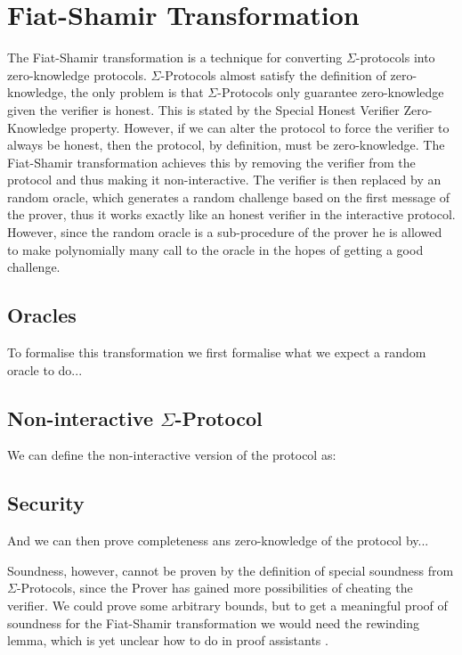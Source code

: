 \section{Fiat-Shamir Transformation}
\label{subsec:fiat-shamir}
The Fiat-Shamir transformation is a technique for converting $\Sigma$-protocols
into zero-knowledge protocols. $\Sigma$-Protocols almost satisfy the definition
of zero-knowledge, the only problem is that $\Sigma$-Protocols only guarantee
zero-knowledge given the verifier is honest. This is stated by the Special
Honest Verifier Zero-Knowledge property. However, if we can alter the protocol
to force the verifier to always be honest, then the protocol, by definition,
must be zero-knowledge.
The Fiat-Shamir transformation achieves this by removing the verifier from the
protocol and thus making it non-interactive. The verifier is then replaced by an
random oracle, which generates a random challenge based on the first message of
the prover, thus it works exactly like an honest verifier in the interactive
protocol. However, since the random oracle is a sub-procedure of the prover he
is allowed to make polynomially many call to the oracle in the hopes of getting
a good challenge.

\subsection{Oracles}
\label{subsec:sigma:fiat:oracle}


To formalise this transformation we first formalise what we expect a random
oracle to do...

\subsection{Non-interactive $\Sigma$-Protocol}
\label{subsec:sigma:fiat:protocol}

We can define the non-interactive version of the protocol as:

\subsection{Security}
\label{subsec:sigma:fiat:security}

And we can then prove completeness ans zero-knowledge of the protocol by...

Soundness, however, cannot be proven by the definition of special soundness from
$\Sigma$-Protocols, since the Prover has gained more possibilities of cheating
the verifier. We could prove some arbitrary bounds, but to get a meaningful
proof of soundness for the Fiat-Shamir transformation we would need the
rewinding lemma, which is yet unclear how to do in proof assistants
.

